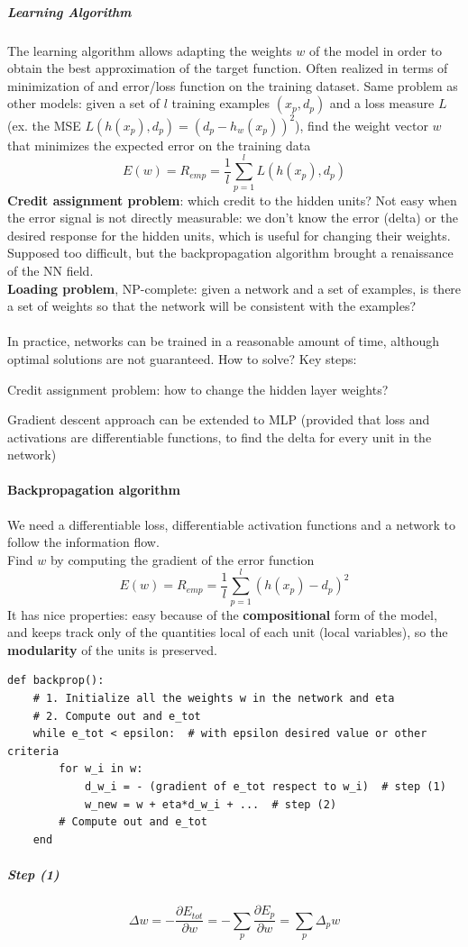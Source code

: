 \documentclass[10pt]{report}
\begin{document}
\subparagraph{Learning Algorithm} The learning algorithm allows adapting the weights $w$ of the model in order to obtain the best approximation of the target function. Often realized in terms of minimization of and error/loss function on the training dataset. Same problem as other models: given a set of $l$ training examples $(x_p, d_p)$ and a loss measure $L$ (ex. the MSE $L(h(x_p), d_p) = (d_p - h_w(x_p))^2$), find the weight vector $w$ that minimizes the expected error on the training data $$E(w) = R_{emp} = \frac{1}{l}\sum_{p=1}^l L(h(x_p), d_p)$$
\textbf{Credit assignment problem}: which credit to the hidden units? Not easy when the error signal is not directly measurable: we don't know the error (delta) or the desired response for the hidden units, which is useful for changing their weights. Supposed too difficult, but the backpropagation algorithm brought a renaissance of the NN field.\\
\textbf{Loading problem}, NP-complete: given a network and a set of examples, is there a set of weights so that the network will be consistent with the examples?\\\\
In practice, networks can be trained in a reasonable amount of time, although optimal solutions are not guaranteed. How to solve? Key steps:
\begin{list}{}{}
	\item Credit assignment problem: how to change the hidden layer weights?
	\item Gradient descent approach can be extended to MLP (provided that loss and activations are differentiable functions, to find the delta for every unit in the network)
\end{list}
\paragraph{Backpropagation algorithm} We need a differentiable loss, differentiable activation functions and a network to follow the information flow.\\
Find $w$ by computing the gradient of the error function $$E(w) = R_{emp} = \frac{1}{l}\sum_{p=1}^l (h(x_p) - d_p)^2$$
It has nice properties: easy because of the \textbf{compositional} form of the model, and keeps track only of the quantities local of each unit (local variables), so the \textbf{modularity} of the units is preserved.
\begin{lstlisting}[style=myPython]
def backprop():
	# 1. Initialize all the weights w in the network and eta
	# 2. Compute out and e_tot
	while e_tot < epsilon:  # with epsilon desired value or other criteria
		for w_i in w:
			d_w_i = - (gradient of e_tot respect to w_i)  # step (1)
			w_new = w + eta*d_w_i + ...  # step (2)
		# Compute out and e_tot
	end
\end{lstlisting}
\subparagraph{Step (1)} $$\Delta w = - \frac{\partial E_{tot}}{\partial w} = - \sum_p \frac{\partial E_p}{\partial w} = \sum_p \Delta_p w$$
\end{document}
